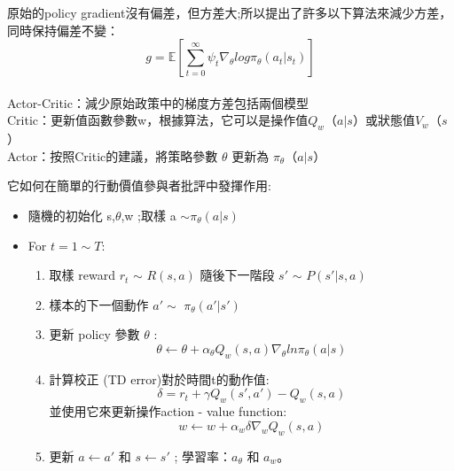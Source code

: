 原始的policy gradient沒有偏差，但方差大;所以提出了許多以下算法來減少方差，同時保持偏差不變：\\[5pt]
$$g = \mathbb{E}[\sum_{t=0}^\infty\psi_t\nabla_\theta log\pi_\theta(a_t \vert s_t)]$$\\[5pt]
Actor-Critic：減少原始政策中的梯度方差包括兩個模型\\[5pt]
Critic：更新值函數參數w，根據算法，它可以是操作值$ Q_w$（$a \vert s$）或狀態值$V_w$（$s$） \\[5pt]
Actor：按照Critic的建議，將策略參數 $\theta$ 更新為 $\pi_\theta$（$a \vert s$）\\[5pt]
\begin{Large}
它如何在簡單的行動價值參與者批評中發揮作用:
\end{Large}
\begin{itemize}
\item 隨機的初始化 s,$\theta$,w ;取樣 a $\sim
\pi_\theta(a \vert s)$
\end{itemize}
\begin{itemize}
\item For $t =1 \sim T:$ 
\begin{enumerate}[1]
\item 取樣 reward $r_t$ $\sim$ $R(s,a)$ 隨後下一階段 $s'$ $\sim$ $P(s'\vert s,a)$ 
\item 樣本的下一個動作 $a' \sim$ $\pi_\theta(a'\vert s')$
\item 更新 policy 參數 $\theta$ :\\
$$\theta\leftarrow\theta+\alpha_\theta Q_w(s,a)\nabla_\theta ln\pi_\theta(a\vert s)$$
\item 計算校正 (TD error)對於時間t的動作值:\\
$$\delta = r_t + \gamma Q_w(s',a')-Q_w(s,a)$$
並使用它來更新操作action - value function:\\
$$w\leftarrow w+\alpha_w \delta \nabla_w Q_w(s,a) $$
\item 更新 $a\leftarrow a'$ 和 $ s \leftarrow s'$ ; 學習率：$a_\theta$ 和 $a_w$。
\end{enumerate}   
\end{itemize}\newpage

\iffalse
